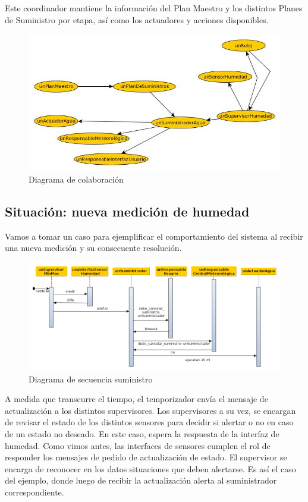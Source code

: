 Este coordinador mantiene la información del Plan Maestro y los distintos Planes de Suministro por etapa, así como los actuadores y acciones disponibles.

\begin{figure}[h!]
  \centering
  \includegraphics[width=1\textwidth]{./imagenes/objetosCoordinador.jpg}
  \caption{Diagrama de colaboración}
  \label{fig:sec_sum1}
\end{figure}


\subsection{Situación: nueva medición de humedad}
Vamos a tomar un caso para ejemplificar el comportamiento del sistema al recibir una nueva medición y su consecuente resolución.

\begin{figure}[h!]
  \centering
  \includegraphics[width=1\textwidth]{./imagenes/secuencia_suministro1.png}
  \caption{Diagrama de secuencia suministro}
  \label{fig:sec_sum1}
\end{figure}

A medida que transcurre el tiempo, el temporizador envía el mensaje de actualización a los distintos supervisores. 
Los supervisores a su vez, se encargan de revisar el estado de los distintos sensores para decidir si alertar o no en caso de un estado no deseado.
En este caso, espera la respuesta de la interfaz de humedad. Como vimos antes, las interfaces de sensores cumplen el rol de responder los mensajes de pedido de actualización de estado. 
El supervisor se encarga de reconocer en los datos situaciones que deben alertarse. Es así el caso del ejemplo, donde luego de recibir la actualización alerta al suministrador correspondiente.

